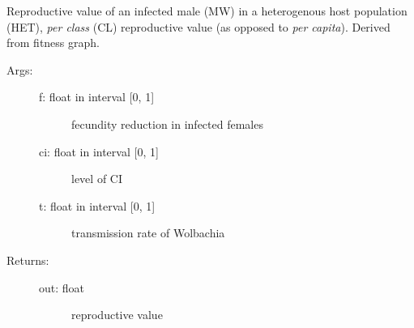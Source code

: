 \documentclass[letterpaper,10pt,english]{sphinxmanual}
\begin{document}
\begin{fulllineitems}
\label{index:wspec.analytical.reproval_MWHETCL}
Reproductive value of an infected male (MW) in a heterogenous 
host population (HET), \emph{per class} (CL) reproductive value (as 
opposed to \emph{per capita}). Derived from fitness graph.
\begin{description}
\item[{Args:}] \leavevmode\begin{description}
\item[{f: float in interval {[}0, 1{]}}] \leavevmode
fecundity reduction in infected females

\item[{ci: float in interval {[}0, 1{]}}] \leavevmode
level of CI

\item[{t: float in interval {[}0, 1{]}}] \leavevmode
transmission rate of Wolbachia

\end{description}

\item[{Returns:}] \leavevmode\begin{description}
\item[{out: float}] \leavevmode
reproductive value

\end{description}

\end{description}

\end{fulllineitems}

\end{document}
